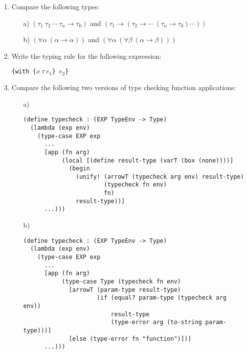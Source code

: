 \begin{enumerate}
\item Compare the following types:
\begin{itemize}
  \item[a)] %
$(\tau_1\ \tau_2\ \cdots\ \tau_n \rightarrow \tau_0)$ and
$(\tau_1 \rightarrow (\tau_2 \rightarrow \cdots\ (\tau_n \rightarrow \tau_0) \cdots ))$

  \item[b)] %
$(\forall \alpha\ (\alpha \rightarrow \alpha))$ and
$(\forall \alpha\ (\forall \beta\ (\alpha \rightarrow \beta)))$
\end{itemize}

\item Write the typing rule for the following expression:

\verb+{with {+$x\ \tau\ e_1$\verb+} +$e_2$\verb+}+

\item Compare the following two versions of type checking function applications:
\begin{itemize}
  \item[a)]
{
\begin{verbatim}
(define typecheck : (EXP TypeEnv -> Type)
  (lambda (exp env)
    (type-case EXP exp
      ...
      [app (fn arg)
           (local [(define result-type (varT (box (none))))]
             (begin
               (unify! (arrowT (typecheck arg env) result-type)
                       (typecheck fn env)
                       fn)
               result-type))]
      ...)))
\end{verbatim}
}

  \item[b)]
{
\begin{verbatim}
(define typecheck : (EXP TypeEnv -> Type)
  (lambda (exp env)
    (type-case EXP exp
      ...
      [app (fn arg)
           (type-case Type (typecheck fn env)
             [arrowT (param-type result-type)
                     (if (equal? param-type (typecheck arg env))
                         result-type
                         (type-error arg (to-string param-type)))]
             [else (type-error fn "function")])]
      ...)))
\end{verbatim}
}
\end{itemize}


\end{enumerate}
